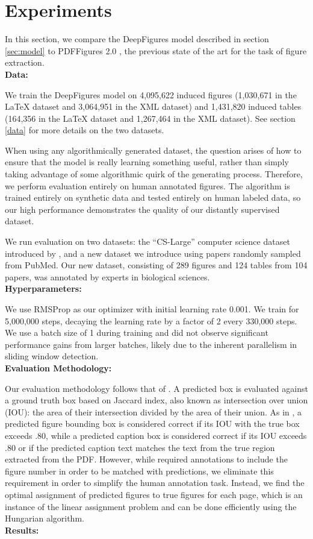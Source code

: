 \documentclass[sigconf]{acmart}
\begin{document}
\section{Experiments}\label{results}
In this section, we compare the DeepFigures model described in section \ref{sec:model} to PDFFigures 2.0 \cite{pdffigures2}, the previous state of the art for the task of figure extraction.
\\[15pt]\textbf{Data:}

We train the DeepFigures model on 4,095,622 induced figures (1,030,671 in the LaTeX dataset and 3,064,951 in the XML dataset) and 1,431,820 induced tables (164,356 in the LaTeX dataset and 1,267,464 in the XML dataset).
See section \ref{data} for more details on the two datasets.

When using any algorithmically generated dataset, the question arises of how to ensure that the model is really learning something useful, rather than simply taking advantage of some algorithmic quirk of the generating process. Therefore, we perform evaluation entirely on human annotated figures. The algorithm is trained entirely on synthetic data and tested entirely on human labeled data, so our high performance demonstrates the quality of our distantly supervised dataset.

We run evaluation on two datasets: the ``CS-Large'' computer science dataset introduced by \cite{pdffigures2}, and a new dataset we introduce using papers randomly sampled from PubMed. Our new dataset, consisting of 289 figures and 124 tables  from 104 papers, was annotated by experts in biological sciences.
\\[15pt]\textbf{Hyperparameters:}

We use RMSProp as our optimizer with initial learning rate 0.001. We train for 5,000,000 steps, decaying the learning rate by a factor of 2 every 330,000 steps. We use a batch size of 1 during training and did not observe significant performance gains from larger batches, likely due to the inherent parallelism in sliding window detection.
\\[15pt]\textbf{Evaluation Methodology:}

Our evaluation methodology follows that of \cite{pdffigures2}. A predicted box is evaluated against a ground truth box based on Jaccard index, also known as intersection over union (IOU): the area of their intersection divided by the area of their union. As in \cite{pdffigures2}, a predicted figure bounding box is considered correct if its IOU with the true box exceeds .80, while a predicted caption box is considered correct if its IOU exceeds .80 or if the predicted caption text matches the text from the true region extracted from the PDF. However, while \cite{pdffigures2} required annotations to include the figure number in order to be matched with predictions, we eliminate this requirement in order to simplify the human annotation task. Instead, we find the optimal assignment of predicted figures to true figures for each page, which is an instance of the linear assignment problem and can be done efficiently using the Hungarian algorithm.
\\[15pt]\textbf{Results:}
\end{document}
